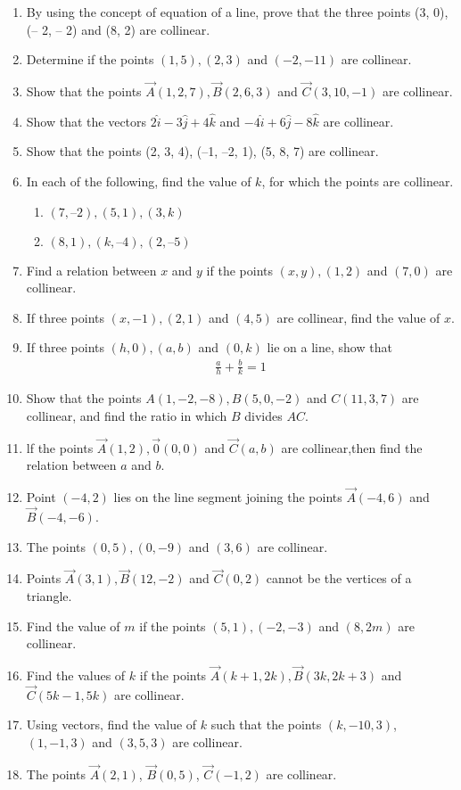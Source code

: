 \begin{enumerate}[label=\thesubsection.\arabic*,ref=\thesubsection.\theenumi]
\item 
 By using the concept of equation of a line, prove that the three points (3, 0), (– 2, – 2) and (8, 2) are collinear.
\label{chapters/11/10/2/20}
	\\
	\solution 

\item Determine if the points $(1,5),(2,3)$ and $(-2,-11)$ are collinear.
\item Show that the points $\vec{A}(1,2,7), \vec{B}(2,6,3)$ and $\vec{C}(3,10,-1)$ are collinear.
\item Show that the vectors $2\hat{i}-3\hat{j}+4\hat{k}$ and $-4\hat{i}+6\hat{j}-8\hat{k}$ are collinear.
\item Show that the points (2, 3, 4), (–1, –2, 1), (5, 8, 7) are collinear.
\item In each of the following, find the value of $k$, for which the points are collinear.
\begin{enumerate}
\item $(7, –2), (5, 1), (3, k)$
\item $(8, 1), (k, – 4), (2, –5)$
\end{enumerate}
		\label{10/7/3/2}
\item Find a relation between $x$ and $y$ if the points $(x, y), (1, 2)$  and  $(7, 0)$ are collinear.
\item If three points $(x, -1), (2, 1)$ and $(4, 5)$ are collinear, find the value of $x$.
\label{chapters/11/10/1/8}
\item If three points $(h, 0), (a, b)$ and $(0, k)$ lie on a line, 
show that 
\begin{align}
\frac{a}{h}+\frac{b}{k}=1
\end{align}
\label{chapters/11/10/1/13}
\item Show that the points $A (1, -2, -8), B (5, 0, -2)$ and $C (11, 3, 7)$ are collinear, and find the ratio in which $B$ divides $AC$.
\item lf the points $\vec{A}(1,2),\vec{0}(0,0)$ and $\vec{C}(a,b)$ are collinear,then find the relation between $a$ and $b$.
	\item Point $ (-4,2)$ lies on the line segment joining the points $ \vec{A}(-4,6)$  and  $\vec{B}(-4,-6)$.
 \item The points $(0,5),(0,-9)$ and $(3,6)$ are collinear.
\item Points $\vec{A}(3,1), \vec{B}(12,-2)$  and  $\vec {C}(0,2)$ cannot be the vertices of a triangle.
\item Find the value of $m$ if the points $(5,1),(-2,-3)$  and $(8,2m)$ are collinear.
\item Find the values of $k$ if the points $\vec{A}(k+1,2k),\vec{B}(3k,2k+3)$ and $\vec{C}(5k-1,5k)$ are collinear.
\item Using vectors, find the value of $k$ such that the points $(k,-10,3)$, $(1,-1,3)$  and  $(3,5,3)$ are collinear.
\item The points $\vec{A}(2,1)$, $\vec{B}(0,5)$, $\vec{C}(-1,2)$ are collinear.
\end{enumerate}
